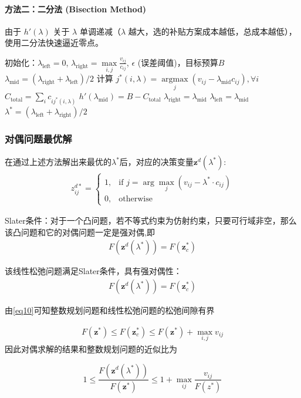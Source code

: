 \paragraph{方法二：二分法 (Bisection Method)}
由于 $h'(\lambda)$ 关于 $\lambda$ 单调递减（$\lambda$ 越大，选的补贴方案成本越低，总成本越低），使用二分法快速逼近零点。

\begin{algorithm}[H]
\caption{二分法求解 $\lambda^*$}
\begin{algorithmic}[1]
\State 初始化：$\lambda_{\text{left}}=0$, $\lambda_{\text{right}}= \max\limits_{i,j}\frac{v_{ij}}{c_{ij}}$, $\epsilon$ (误差阈值)，目标预算$B$
    \State $\lambda_{\text{mid}} = (\lambda_{\text{right}} + \lambda_{\text{left}})/2$
    \State 计算 $j^*(i,\lambda) = \underset{j}{\operatorname{argmax}} \left( v_{ij} - \lambda_{\text{mid}} c_{ij} \right), \forall i$
    \State $C_{\text{total}} = \sum_i c_{ij^*(i,\lambda)}$
    \State $h'(\lambda_{\text{mid}}) =  B - C_{\text{total}} $
        \State $\lambda_{\text{right}} = \lambda_{\text{mid}}$ 
    \Else
        \State $\lambda_{\text{left}} = \lambda_{\text{mid}}$  
    \EndIf
\EndWhile
\State \Return $\lambda^* = (\lambda_{\text{left}} + \lambda_{\text{right}})/2$
\end{algorithmic}
\end{algorithm}
\subsubsection{对偶问题最优解}
在通过上述方法解出来最优的$\lambda^*$后，对应的决策变量$\bm z^{d}(\lambda^*)$:
\begin{align}
z_{ij}^{d*} = 
\begin{cases}
1, & \text{if } j = \arg\max\limits_{j} \left( v_{ij} - \lambda^* \cdot c_{ij} \right) \\ 
0, & \text{otherwise} 
\end{cases}
\end{align}

Slater条件：对于一个凸问题，若不等式约束为仿射约束，只要可行域非空，那么该凸问题和它的对偶问题一定是强对偶,即
\begin{align}
F(\bm z^d(\lambda^*)) = F(\bm z_c^{*})
\end{align}

该线性松弛问题满足Slater条件，具有强对偶性：
\begin{align}
F(\bm z^d(\lambda^*)) = F(\bm z_c^{*}) 
\end{align}

由\eqref{eq10}可知整数规划问题和线性松弛问题的松弛间隙有界

\begin{align} 
F(\bm z^*)\leq F(\bm z_c^*)\leq F(\bm z^*) + \max_{i,j} v_{ij}
\end{align}
因此对偶求解的结果和整数规划问题的近似比为\par
$$1\leq \frac{F(\bm z^d(\lambda^*))}{F(\bm z^*)}\leq 1+\max_{ij}\frac{v_{ij}}{F(z^*)}$$